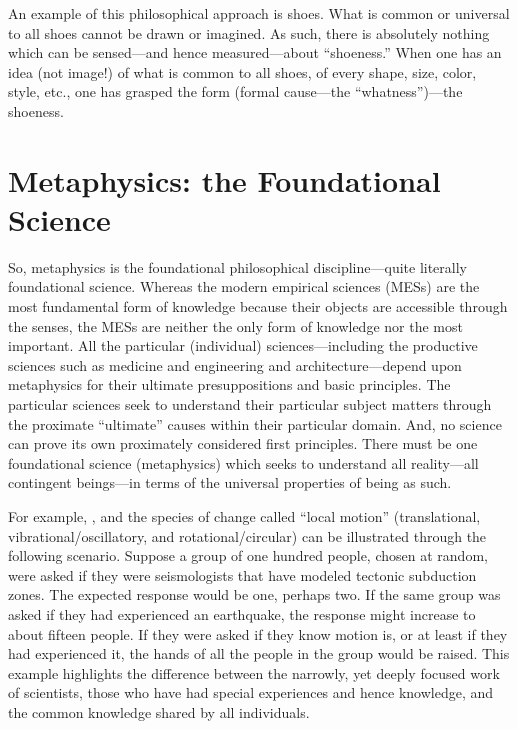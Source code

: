 An example of this philosophical approach is shoes. What is common or universal to all shoes cannot be drawn or imagined. As such, there is absolutely nothing which can be sensed---and hence measured---about ``shoeness.'' When one has an idea (not image!) of what is common to all shoes, of every shape, size, color, style, etc., one has grasped  the form (formal cause---the ``whatness'')---the shoeness.

\section{Metaphysics: the Foundational Science}\label{sec:metaphysics}

So, metaphysics is the foundational philosophical discipline---quite literally  foundational science. Whereas the modern empirical sciences (MESs) are the most fundamental form of knowledge because their objects are accessible through the senses, the MESs are neither the only form of knowledge nor the most important. All the particular (individual) sciences---including the productive sciences such as medicine and engineering and architecture---depend upon metaphysics for their ultimate presuppositions and basic principles. The particular sciences seek to understand their particular subject matters through the proximate ``ultimate'' causes within their particular domain. And, no science can prove its own proximately considered first principles. There must be one foundational science (metaphysics) which seeks to understand all reality---all contingent beings---in terms of the universal properties of being as such.

For example, , and the species of change called ``local motion'' (translational, vibrational/oscillatory, and rotational/circular) can be illustrated through the following scenario. Suppose a group of one hundred people, chosen at random, were asked if they were seismologists that have modeled tectonic subduction zones. The expected response would be one, perhaps two. If the same group was asked if they had experienced an earthquake, the response might increase to about fifteen people. If they were asked if they know  motion is, or at least if they had experienced it, the hands of all the people in the group would be raised. This example highlights the difference between the narrowly, yet deeply focused work of scientists, those who have had special experiences and hence knowledge, and the common knowledge shared by all individuals.


